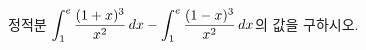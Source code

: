 정적분 $\displaystyle\int_{1}^{e}\dfrac{(1+x)^3}{x^2}\mkern3mu dx-\int_{1}^{e}\dfrac{(1-x)^3}{x^2}\mkern3mu dx$의 값을 구하시오.
